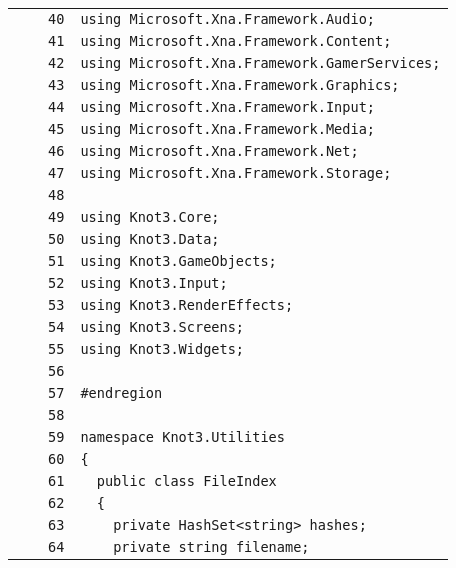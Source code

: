 \documentclass[a4paper,10pt]{article}
\begin{document}
\begin{longtable}[l]{lrrl}
\cellcolor{gray} &  & \verb~40~ & \verb~using Microsoft.Xna.Framework.Audio;~\\
\cellcolor{gray} &  & \verb~41~ & \verb~using Microsoft.Xna.Framework.Content;~\\
\cellcolor{gray} &  & \verb~42~ & \verb~using Microsoft.Xna.Framework.GamerServices;~\\
\cellcolor{gray} &  & \verb~43~ & \verb~using Microsoft.Xna.Framework.Graphics;~\\
\cellcolor{gray} &  & \verb~44~ & \verb~using Microsoft.Xna.Framework.Input;~\\
\cellcolor{gray} &  & \verb~45~ & \verb~using Microsoft.Xna.Framework.Media;~\\
\cellcolor{gray} &  & \verb~46~ & \verb~using Microsoft.Xna.Framework.Net;~\\
\cellcolor{gray} &  & \verb~47~ & \verb~using Microsoft.Xna.Framework.Storage;~\\
\cellcolor{gray} &  & \verb~48~ & \verb~~\\
\cellcolor{gray} &  & \verb~49~ & \verb~using Knot3.Core;~\\
\cellcolor{gray} &  & \verb~50~ & \verb~using Knot3.Data;~\\
\cellcolor{gray} &  & \verb~51~ & \verb~using Knot3.GameObjects;~\\
\cellcolor{gray} &  & \verb~52~ & \verb~using Knot3.Input;~\\
\cellcolor{gray} &  & \verb~53~ & \verb~using Knot3.RenderEffects;~\\
\cellcolor{gray} &  & \verb~54~ & \verb~using Knot3.Screens;~\\
\cellcolor{gray} &  & \verb~55~ & \verb~using Knot3.Widgets;~\\
\cellcolor{gray} &  & \verb~56~ & \verb~~\\
\cellcolor{gray} &  & \verb~57~ & \verb~#endregion~\\
\cellcolor{gray} &  & \verb~58~ & \verb~~\\
\cellcolor{gray} &  & \verb~59~ & \verb~namespace Knot3.Utilities~\\
\cellcolor{gray} &  & \verb~60~ & \verb~{~\\
\cellcolor{gray} &  & \verb~61~ & \verb~  public class FileIndex~\\
\cellcolor{gray} &  & \verb~62~ & \verb~  {~\\
\cellcolor{gray} &  & \verb~63~ & \verb~    private HashSet<string> hashes;~\\
\cellcolor{gray} &  & \verb~64~ & \verb~    private string filename;~\\

\end{longtable}
\end{document}

